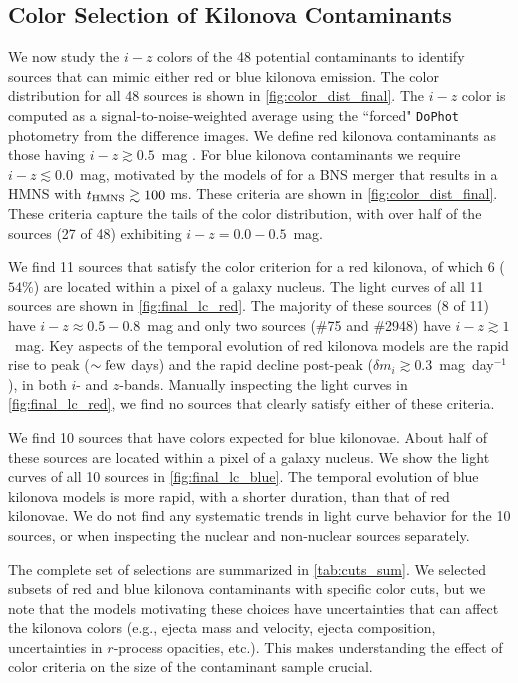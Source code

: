 \subsection{Color Selection of Kilonova Contaminants}
\label{sec:kn_search}
We now study the $i-z$ colors of the 48 potential contaminants to identify sources that can mimic either red or blue kilonova emission. The color distribution for all 48 sources is shown in \autoref{fig:color_dist_final}. The $i-z$ color is computed as a signal-to-noise-weighted average using the ``forced" {\tt DoPhot} photometry from the difference images. We define red kilonova contaminants as those having $i-z \gtrsim 0.5$~mag \citep[CB15]{barnes13}. For blue kilonova contaminants we require $i-z \lesssim 0.0$~mag, motivated by the models of \cite{kasen+15} for a BNS merger that results in a HMNS with $t_{\rm HMNS}\gtrsim 100$ ms. These criteria are shown in \autoref{fig:color_dist_final}. These criteria capture the tails of the color distribution, with over half of the sources (27 of 48) exhibiting $i-z = 0.0-0.5$~mag.

We find 11 sources that satisfy the color criterion for a red kilonova, of which 6 ($54\%$) are located within a pixel of a galaxy nucleus.  The light curves of all 11 sources are shown in \autoref{fig:final_lc_red}. The majority of these sources (8 of 11) have $i-z \approx 0.5-0.8$~mag and only two sources (\#75 and \#2948) have $i-z \gtrsim 1$~mag. Key aspects of the temporal evolution of red kilonova models are the rapid rise to peak ($\sim \rm few$ days) and the rapid decline post-peak ($\delta m_i \gtrsim 0.3$~mag~day$^{-1}$), in both $i$- and $z$-bands. Manually inspecting the light curves in \autoref{fig:final_lc_red}, we find no sources that clearly satisfy either of these criteria.

We find 10 sources that have colors expected for blue kilonovae. About half of these sources are located within a pixel of a galaxy nucleus. We show the light curves of all 10 sources in \autoref{fig:final_lc_blue}. The temporal evolution of blue kilonova models is more rapid, with a shorter duration, than that of red kilonovae. We do not find any systematic trends in light curve behavior for the 10 sources, or when inspecting the nuclear and non-nuclear sources separately.

The complete set of selections are summarized in \autoref{tab:cuts_sum}. We selected subsets of red and blue kilonova contaminants with specific color cuts, but we note that the models motivating these choices have uncertainties that can affect the kilonova colors (e.g., ejecta mass and velocity, ejecta composition, uncertainties in $r$-process opacities, etc.). This makes understanding the effect of color criteria on the size of the contaminant sample crucial. 

